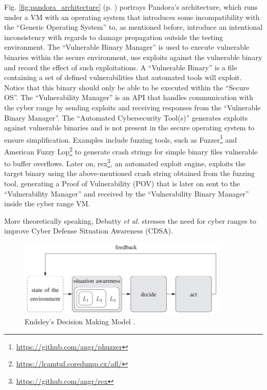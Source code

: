 Fig. \ref{fig:pandora_architecture} (p. \pageref{fig:pandora_architecture}) portrays Pandora's architecture, which runs under a VM with an operating system that introduces some incompatibility with the ``Generic Operating System'' to, as mentioned before, introduce an intentional inconsistency with regards to damage propagation outside the testing environment. The ``Vulnerable Binary Manager'' is used to execute vulnerable binaries within the secure environment, use exploits against the vulnerable binary and record the effect of such exploitations. A ``Vulnerable Binary'' is a file containing a set of defined vulnerabilities that automated tools will exploit. Notice that this binary should only be able to be executed within the ``Secure OS''. The ``Vulnerability Manager'' is an API that handles communication with the cyber range by sending exploits and receiving responses from the ``Vulnerable Binary Manager''. The ``Automated Cybersecurity Tool(s)'' generates exploits against vulnerable binaries and is not present in the secure operating system to ensure simplification. Examples include fuzzing tools, such as Fuzzer\footnote{\url{https://github.com/angr/phuzzer}} and American Fuzzy Lop\footnote{\url{https://lcamtuf.coredump.cx/afl/}} to generate crash strings for simple binary files vulnerable to buffer overflows. Later on, rex\footnote{\url{https://github.com/angr/rex}}, an automated exploit engine, exploits the target binary using the above-mentioned crash string obtained from the fuzzing tool, generating a Proof of Vulnerability (POV) that is later on sent to the ``Vulnerability Manager'' and received by the ``Vulnerability Binary Manager'' inside the cyber range VM.

More theoretically speaking, Debatty \textit{et al.} \cite{building_cr_ref} stresses the need for cyber ranges to improve Cyber Defense Situation Awareness (CDSA). 

\begin{figure}[H]
    \includegraphics[width=10cm]{figures/building_cr_endsley_model.png}
    \caption{Endsley's Decision Making Model \cite{endsley_ref}.}
    \label{fig:endsley_decision_making_model}
\end{figure}

